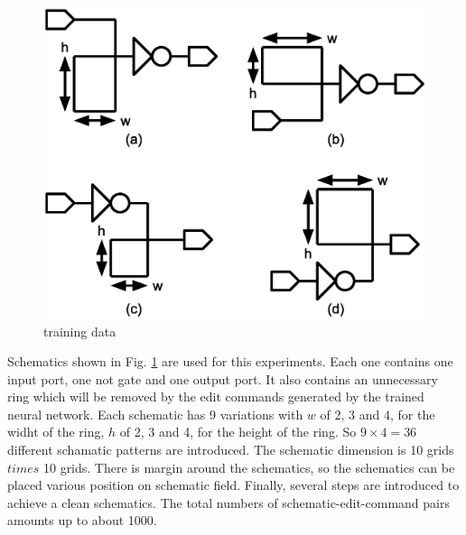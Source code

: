 \documentclass[twocolumn]{article}
\begin{document}
\begin{figure}[tb]
 \begin{center}
  \begin{minipage}{\hsize}
   \includegraphics[width=\hsize]{fig/training_data_01.eps}
   \caption{training data}
   \label{fig:training_data}
  \end{minipage}
 \end{center}
\end{figure}

Schematics shown in Fig. \ref{fig:training_data} are used for this experiments.
Each one contains one input port, one not gate and one output port.
It also contains an unnecessary ring which will be removed
by the edit commands generated by the trained neural network.
Each schematic has 9 variations with
$w$ of 2, 3 and 4, for the widht of the ring,
$h$ of 2, 3 and 4, for the height of the ring.
So $9 \times 4 = 36$ different schamatic patterns are introduced.
The schematic dimension is 10 grids $times$ 10 grids.
There is margin around the schematics,
so the schematics can be placed various position on schematic field.
Finally, several steps are introduced to achieve a clean schematics.
The total numbers of schematic-edit-command pairs amounts up to about 1000.
\end{document}
